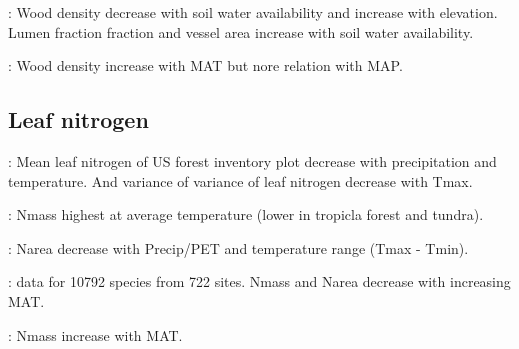 \documentclass[a4paper,11pt]{article}
\begin{document}
\citet{Cornwell-2009}: Wood density decrease with soil water availability and increase with elevation. Lumen fraction fraction and vessel area increase with soil water availability.

\citet{Stahl-2014}: Wood density increase with MAT but nore relation with MAP.

\subsection{Leaf nitrogen}

\citet{Swenson-2010}: Mean leaf nitrogen of US forest inventory plot decrease with precipitation and temperature. And variance of variance of leaf nitrogen decrease with Tmax.

\citet{Reich-2004}: Nmass highest at average temperature (lower in tropicla forest and tundra).

\citet{Maire-2015}: Narea decrease with Precip/PET and temperature range (Tmax - Tmin).

\citet{Moles-2014}: data for 10792 species from 722 sites. Nmass and Narea decrease with increasing MAT.

\citet{Ordonez-2009}: Nmass increase with MAT.

\clearpage



\end{document}
